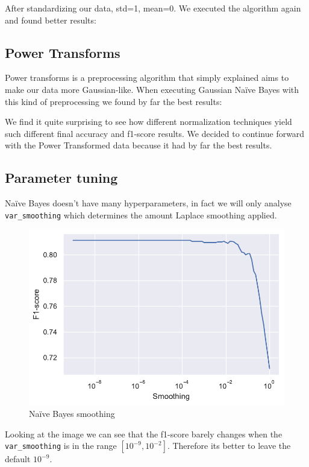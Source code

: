 After standardizing our data, std=1, mean=0. We executed the algorithm again and found better results:


\subsection{Power Transforms}

Power transforms is a preprocessing algorithm that simply explained aims to make our data more Gaussian-like. When executing Gaussian Na\"ive Bayes with this kind of preprocessing we found by far the best results:


We find it quite surprising to see how different normalization techniques yield such 
different final accuracy and f1-score results. We decided to continue forward with the Power 
Transformed data because it had by far the best results.

\subsection{Parameter tuning}

Na\"ive Bayes doesn't have many hyperparameters, in fact we will only analyse \texttt{var\_smoothing} which determines the amount Laplace smoothing applied.

\begin{figure}[H]
    \centering
    \includegraphics{figures/naive_bayes_smoothing_cv.pdf}
    \caption{Na\"ive Bayes smoothing}%
    \label{fig:naive_bayes_smoothing_cv}
\end{figure}

Looking at the image we can see that the f1-score barely changes when the \texttt{var\_smoothing} is in the range $[10^{-9}, 10^{-2}]$. Therefore its better to leave the default $10^{-9}$.
